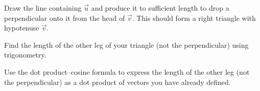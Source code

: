 \documentclass[12pt]{exam}
\theoremstyle{definition}
\begin{document}
\begin{questions}

\question Draw the line containing $\vec{u}$ and produce it to sufficient length to drop a perpendicular onto it from the head of $\vec{v}$. This should form a right triangle with hypotenuse $\vec{v}$.


\question Find the length of the other leg of your triangle (not the perpendicular) using trigonometry.


\question Use the dot product--cosine formula to express the length of the other leg (not the perpendicular) as a dot product of vectors you have already defined.



\end{questions} 
\end{document}
